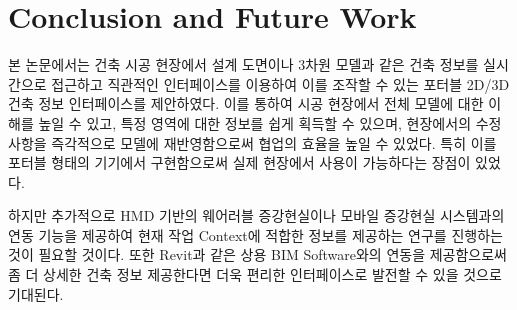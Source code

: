 

\section{Conclusion and Future Work}

본 논문에서는 건축 시공 현장에서 설계 도면이나 3차원 모델과 같은 건축 정보를 실시간으로 접근하고 직관적인 인터페이스를 이용하여 이를 조작할 수 있는 포터블 2D/3D 건축 정보 인터페이스를 제안하였다. 이를 통하여 시공 현장에서 전체 모델에 대한 이해를 높일 수 있고, 특정 영역에 대한 정보를 쉽게 획득할 수 있으며, 현장에서의 수정 사항을 즉각적으로 모델에 재반영함으로써 협업의 효율을 높일 수 있었다. 특히 이를 포터블 형태의 기기에서 구현함으로써 실제 현장에서 사용이 가능하다는 장점이 있었다.


하지만 추가적으로 HMD 기반의 웨어러블 증강현실이나 모바일 증강현실 시스템과의 연동 기능을 제공하여 현재 작업 Context에 적합한 정보를 제공하는 연구를 진행하는 것이 필요할 것이다. 또한 Revit과 같은 상용 BIM Software와의 연동을 제공함으로써 좀 더 상세한 건축 정보 제공한다면 더욱 편리한 인터페이스로 발전할 수 있을 것으로 기대된다.

